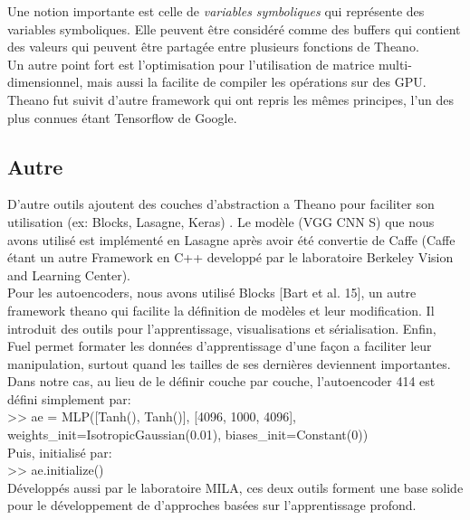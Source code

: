 Une notion importante est celle de \textit{variables symboliques} qui représente des variables symboliques. Elle peuvent être considéré comme des buffers qui contient des valeurs qui peuvent être partagée entre plusieurs fonctions de Theano.\\

Un autre point fort est l'optimisation pour l'utilisation de matrice multi-dimensionnel, mais aussi la facilite de compiler les opérations sur des GPU.\\

Theano fut suivit d'autre framework qui ont repris les mêmes principes, l'un des plus connues étant Tensorflow de Google.

\subsection{Autre}
D'autre outils ajoutent des couches d'abstraction a Theano pour faciliter son utilisation (ex: Blocks, Lasagne, Keras) .
Le modèle (VGG CNN S) que nous avons utilisé est implémenté en Lasagne après avoir été convertie de Caffe (Caffe étant un autre Framework en C++ developpé par le laboratoire Berkeley Vision and Learning Center).\\

Pour les autoencoders, nous avons utilisé Blocks [Bart et al. 15], un autre framework theano qui facilite la définition de modèles et leur modification. Il introduit des outils pour l'apprentissage, visualisations et sérialisation. Enfin, Fuel permet formater les données d'apprentissage d'une façon a faciliter leur manipulation, surtout quand les tailles de ses dernières deviennent importantes.\\

Dans notre cas, au lieu de le définir couche par couche, l'autoencoder 414 est défini simplement par:\\

>> ae = MLP([Tanh(), Tanh()], [4096, 1000, 4096],
              weights\_init=IsotropicGaussian(0.01),
              biases\_init=Constant(0))\\
              

Puis, initialisé par:\\

>> ae.initialize()\\

Développés aussi par le laboratoire MILA, ces deux outils forment une base solide pour le développement de d’approches basées sur l'apprentissage profond.

